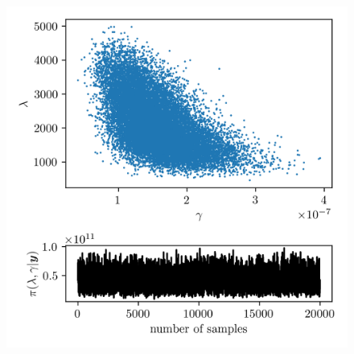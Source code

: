 \begin{figure}[ht!]
	\centering
	\includegraphics{ScatterplusHisto.png}
	\caption[]{}
	\label{fig:}
\end{figure}


